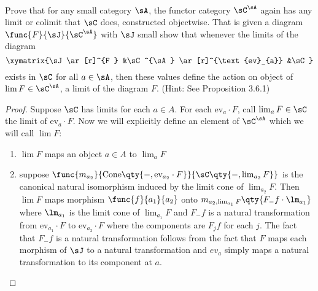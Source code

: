 \documentclass[main.tex]{subfiles}
\begin{document}
\paragraph{}
\begin{exercise}
	Prove that for any small category $\sA$, the functor category $\sC^{\sA}$
	again has any limit or colimit that $\sC$ does, constructed objectwise. That
	is given a diagram $\func{F}{\sJ}{\sC^{\sA}}$ with $\sJ$ small show that
	whenever the limits of the diagram $$ \xymatrix{\sJ \ar[r]^{F } &\sC^{\sA}
	\ar[r]^{\text{ev}_{a}} &\sC} $$ exists in $\sC$ for all $a \in \sA$, then
	these values define the action on object of $\lim F \in \sC^{\sA}$, a limit
	of the diagram $F$. (Hint: See Proposition 3.6.1)
\end{exercise}

\begin{proof}
	Suppose $\sC$ has limits for each $a \in A$. For each $\text{ev}_{a} \cdot
	F$, call $\lim_{a} F \in \sC$ the limit of $\text{ev}_{a} \cdot F$. Now we
	will explicitly define an element of $\sC^{\sA}$ which we will call $\lim
	F$:
	\begin{enumerate}
		\item $\lim F$ maps an object $a \in A$ to $\lim_{a} F$

		\item suppose $\func{m_{a_2}}{\text{Cone}\qty{-,\text{ev}_{a_2} \cdot
			F}}{\sC\qty{-,\lim_{a_2} F}}$ is the canonical natural isomorphism
			induced by the limit cone of $\lim_{a_2} F$. Then $\lim F$ maps
			morphism $\func{f}{a_1}{a_2}$ onto $m_{a_2,\lim_{a_1} F}\qty{F_{-}f
			\cdot \lm_{a_1}}$ where $\lm_{a_1}$ is the limit cone of $\lim_{a_1}
			F$ and $F_{-}f$ is a natural transformation from $\text{ev}_{a_1}
			\cdot F $ to $\text{ev}_{a_2} \cdot F $ where the components are
			$F_{j}f$ for each $j$. The fact that $F_{-}f$ is a natural
			transformation follows from the fact that $F$ maps each morphism of
			$\sJ$ to a natural transformation and $ev_{a}$ simply maps a natural
			transformation to its component at $a$.
	\end{enumerate}


\end{proof}
\end{document}
